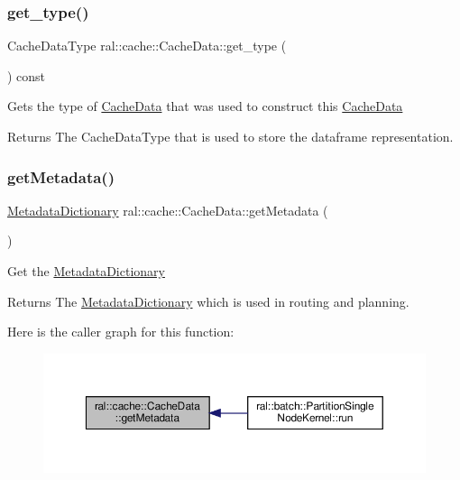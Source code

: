 \subsubsection{\texorpdfstring{get\+\_\+type()}{get\_type()}}
{\footnotesize\ttfamily Cache\+Data\+Type ral\+::cache\+::\+Cache\+Data\+::get\+\_\+type (\begin{DoxyParamCaption}{ }\end{DoxyParamCaption}) const\hspace{0.3cm}{\ttfamily [inline]}}

Gets the type of \hyperlink{classral_1_1cache_1_1CacheData}{Cache\+Data} that was used to construct this \hyperlink{classral_1_1cache_1_1CacheData}{Cache\+Data} \begin{DoxyReturn}{Returns}
The Cache\+Data\+Type that is used to store the dataframe representation. 
\end{DoxyReturn}
\mbox{\label{classral_1_1cache_1_1CacheData_a7e3fea5c3558948f4c461998f7ef434b}} 
\subsubsection{\texorpdfstring{get\+Metadata()}{getMetadata()}}
{\footnotesize\ttfamily \hyperlink{classral_1_1cache_1_1MetadataDictionary}{Metadata\+Dictionary} ral\+::cache\+::\+Cache\+Data\+::get\+Metadata (\begin{DoxyParamCaption}{ }\end{DoxyParamCaption})\hspace{0.3cm}{\ttfamily [inline]}}

Get the \hyperlink{classral_1_1cache_1_1MetadataDictionary}{Metadata\+Dictionary} \begin{DoxyReturn}{Returns}
The \hyperlink{classral_1_1cache_1_1MetadataDictionary}{Metadata\+Dictionary} which is used in routing and planning. 
\end{DoxyReturn}
Here is the caller graph for this function\+:\nopagebreak
\begin{figure}[H]
\begin{center}
\leavevmode
\includegraphics[width=350pt]{classral_1_1cache_1_1CacheData_a7e3fea5c3558948f4c461998f7ef434b_icgraph}
\end{center}
\end{figure}
\mbox{\label{classral_1_1cache_1_1CacheData_aa2c8d58823d781cc1f8e6e589d897642}} 
